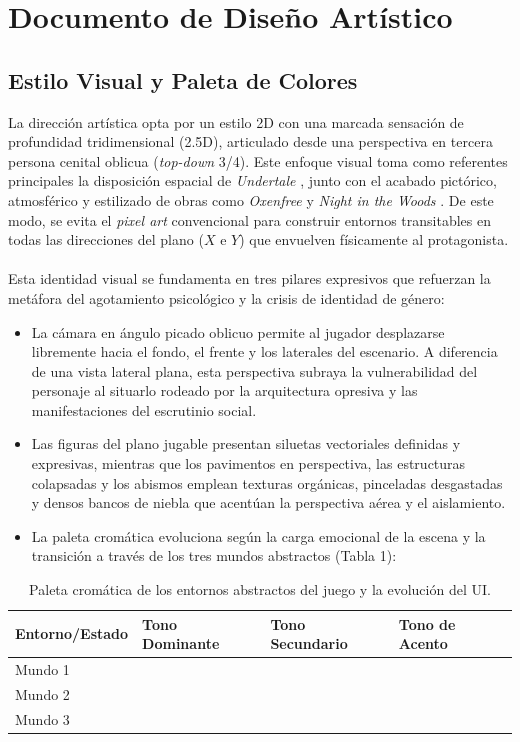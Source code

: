 \section{Documento de Diseño Artístico}
\subsection{Estilo Visual y Paleta de Colores}
La dirección artística opta por un estilo 2D con una marcada sensación de profundidad tridimensional (2.5D), articulado desde una perspectiva en tercera persona cenital oblicua (\textit{top-down} 3/4). Este enfoque visual toma como referentes principales la disposición espacial de \textit{Undertale} \parencite{fox2015}, junto con el acabado pictórico, atmosférico y estilizado de obras como \textit{Oxenfree} \parencite{nightschool2016} y \textit{Night in the Woods} \parencite{infinitefall2017}. De este modo, se evita el \textit{pixel art} convencional para construir entornos transitables en todas las direcciones del plano ($X$ e $Y$) que envuelven físicamente al protagonista.
\\\\
Esta identidad visual se fundamenta en tres pilares expresivos que refuerzan la metáfora del agotamiento psicológico y la crisis de identidad de género:
\begin{itemize}
  \item La cámara en ángulo picado oblicuo permite al jugador desplazarse libremente hacia el fondo, el frente y los laterales del escenario. A diferencia de una vista lateral plana, esta perspectiva subraya la vulnerabilidad del personaje al situarlo rodeado por la arquitectura opresiva y las manifestaciones del escrutinio social.
  \item Las figuras del plano jugable presentan siluetas vectoriales definidas y expresivas, mientras que los pavimentos en perspectiva, las estructuras colapsadas y los abismos emplean texturas orgánicas, pinceladas desgastadas y densos bancos de niebla que acentúan la perspectiva aérea y el aislamiento.
  \item La paleta cromática evoluciona según la carga emocional de la escena y la transición a través de los tres mundos abstractos (Tabla 1):
\end{itemize}
\begin{table}[H]
  \centering
  \caption{Paleta cromática de los entornos abstractos del juego y la evolución del UI.}
  \label{tab:paleta}
  \small
  \renewcommand{\arraystretch}{1.2}
  \begin{tabularx}{\textwidth}{YYYY}
    \toprule
    Entorno/Estado & Tono Dominante & Tono Secundario & Tono de Acento \\
    \midrule
    Mundo 1 &  & & \\
    Mundo 2 &  &  & \\
    Mundo 3 &  &  & \\
    \bottomrule
  \end{tabularx}
\end{table}


